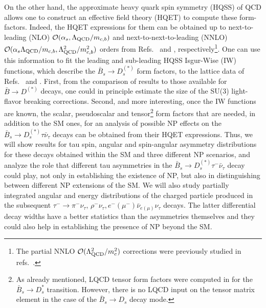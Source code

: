 \documentclass[aps,superscriptaddress,showpacs,nofootinbib,11pt]{revtex4-1}
\begin{document}
 On the other hand, the approximate heavy quark spin symmetry (HQSS) of QCD  allows one to construct an effective field theory (HQET) to compute these form-factors. Indeed, the HQET expressions for them can be obtained up to next-to-leading (NLO)  ${\cal O}(\alpha_s,
\Lambda_{\rm QCD}/m_{c,b})$ and  next-to-next-to-leading (NNLO) ${\cal O}(\alpha_s\Lambda_{\rm QCD}/m_{c,b},
\Lambda^2_{\rm QCD}/m^2_{c,b})$ orders from Refs.~\cite{Bernlochner:2017jka} and \cite{Bernlochner:2022ywh}, respectively\footnote{The partial NNLO ${\cal O}(\Lambda^2_{\rm QCD}/m^2_c)$ corrections were previously studied in  refs.~\cite{Bordone:2019vic,Bordone:2019guc}.  }. 
One can use this information to fit the leading and sub-leading HQSS Isgur-Wise (IW) functions, which describe the $\bar B_s\to D_s^{(*)}$  form factors, to the lattice data of Refs.~\cite{McLean:2019qcx} and \cite{Harrison:2023dzh}. First, from the comparison of results to those available for $\bar B \to D^{(*)}$ decays, one could in principle estimate the size of the SU(3) light-flavor breaking corrections.  Second, and more interesting,  once the IW functions are known, the scalar, pseudoscalar and tensor\footnote{As already mentioned, LQCD tensor form factors were computed in \cite{Harrison:2023dzh} for the $\bar B_s \to D_s^{*}$ transition. However, there is no LQCD input on the tensor matrix element in the case of the $\bar B_s \to D_s$ decay mode.  } form factors that are needed, in addition to the SM ones, for an analysis of possible NP effects on the $\bar B_s\to D_s^{(*)}\tau\bar\nu_\tau$ decays can be obtained from their HQET expressions.   Thus,  we will show results for  tau spin, angular and spin-angular asymmetry distributions for these decays obtained within the SM and three different NP scenarios, and analyze the role that different tau asymmetries in the $\bar B_s\to D_s^{(*)}\tau^-\bar\nu_\tau$ decay could play,  not only in establishing the existence of NP, but also in distinguishing between different NP extensions of the SM. We will also study partially integrated  angular and energy distributions of the charged particle produced in the subsequent $\tau^-
 \to\pi^-\nu_\tau,\,\rho^-\nu_\tau,e^-(\mu^-)\bar\nu_{e(\mu)}\nu_\tau$  decays. The latter differential decay widths have a better statistics than the asymmetries themselves and they could also help in establishing the presence of NP beyond the SM.
\end{document}
